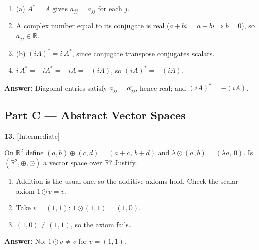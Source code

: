 \documentclass[11pt]{article}
\begin{document}
\begin{tcolorbox}[breakable,colback=ans,colframe=ansb,boxrule=0.5pt,left=4pt,right=4pt,top=2pt,bottom=2pt]\begin{enumerate}[leftmargin=2.2em,itemsep=1pt,topsep=1pt,label=\textbf{Step \arabic*.}]\item (a) $A^{*}=A$ gives $\overline{a_{jj}}=a_{jj}$ for each $j$.
\item A complex number equal to its conjugate is real ($a+bi=a-bi\Rightarrow b=0$), so $a_{jj}\in\mathbb{R}$.
\item (b) $(iA)^{*}=\overline{i}\,A^{*}$, since conjugate transpose conjugates scalars.
\item $\overline{i}\,A^{*}=-iA^{*}=-iA=-(iA)$, so $(iA)^{*}=-(iA)$.
\end{enumerate}\textbf{Answer:} Diagonal entries satisfy $a_{jj}=\overline{a_{jj}}$, hence real; and $(iA)^{*}=-(iA)$.\end{tcolorbox}
\par\vspace{2pt}
\subsection*{\normalsize\color{ink} Part C --- Abstract Vector Spaces}
\begin{minipage}{\linewidth}\textbf{13.} \hfill{\scriptsize\color{ink}[Intermediate]}\par\nopagebreak On $\mathbb{R}^{2}$ define $(a,b)\oplus(c,d)=(a+c,\,b+d)$ and $\lambda\odot(a,b)=(\lambda a,\,0)$. Is $(\mathbb{R}^{2},\oplus,\odot)$ a vector space over $\mathbb{R}$? Justify.
\end{minipage}\par\nopagebreak
\begin{tcolorbox}[breakable,colback=ans,colframe=ansb,boxrule=0.5pt,left=4pt,right=4pt,top=2pt,bottom=2pt]\begin{enumerate}[leftmargin=2.2em,itemsep=1pt,topsep=1pt,label=\textbf{Step \arabic*.}]\item Addition is the usual one, so the additive axioms hold. Check the scalar axiom $1\odot v=v$.
\item Take $v=(1,1)$: $1\odot(1,1)=(1,0)$.
\item $(1,0)\neq(1,1)$, so the axiom fails.
\end{enumerate}\textbf{Answer:} No: $1\odot v\ne v$ for $v=(1,1)$.\end{tcolorbox}
\par\vspace{2pt}
\end{document}
